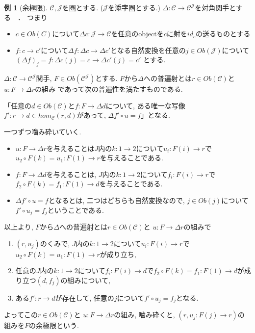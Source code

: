 \documentclass[dvipdfmx,a4paper,11pt]{article}
\theoremstyle{definition}
\newtheorem{exa}[thm]{例}
\begin{document}
\begin{exa}[余極限]
$\mathcal{C}, \mathcal{J}$を圏とする. ($\mathcal{J}$を添字圏とする.)
$\Delta : \mathcal{C} \to \mathcal{C}^{\mathcal{J}}$を対角関手とする　．
つまり
\begin{itemize}
\item$c \in Ob(C)$について$\Delta c : \mathcal{J} \to \mathcal{C}$を任意のobjectを$c$に射を$id_c$の送るものとする
\item  $f: c \to c'$について$\Delta f : \Delta c \to \Delta c'$となる自然変換を任意の$j \in Ob(\mathcal{J})$について$(\Delta f)_{j}=f : \Delta c(j) = c \to \Delta c' (j)=c' $ とする.
\end{itemize}

$\Delta : \mathcal{C} \to \mathcal{C}^{\mathcal{J}}$関手, 
$F \in Ob(\mathcal{C}^{\mathcal{J}})$とする.
$F$から$\Delta $への普遍射とは$r \in Ob(\mathcal{C})$と $u: F \to \Delta r$の組み
であって次の普遍性を満たすものである.

「任意の$d \in Ob(\mathcal{C})$と$f : F\to \Delta d$について, ある唯一な写像$f' : r \to d \in hom_{\mathcal{C}}(r,d)$があって, $\Delta f' \circ u =f$」となる.

一つずつ噛み砕いていく.
\begin{itemize}
\item $u: F \to \Delta r$を与えることは$J$内の$k : 1\to 2$について$u_i : F(i) \to r$で$u_2 \circ F(k) = u_1 : F(1) \to r$を与えることである.
\item $f : F\to \Delta d$を与えることは, $J$内の$k : 1\to 2$について$f_i : F(i) \to r$で$f_2 \circ F(k) = f_1 : F(1) \to d$を与えることである.
\item  $\Delta f' \circ u =f$となるとは, 二つはどちらも自然変換なので, $j \in Ob(j)$について$f' \circ u_j = f_j$ということである.
\end{itemize}
以上より, $F$から$\Delta $への普遍射とは$r \in Ob(\mathcal{C})$と $u: F \to \Delta r$の組みで
\begin{enumerate}
\item $(r, u_j)$のくみで, $J$内の$k : 1\to 2$について$u_i : F(i) \to r$で$u_2 \circ F(k) = u_1 : F(1) \to r$が成り立ち, 
\item 任意の$J$内の$k : 1\to 2$について$f_i : F(i) \to d$で$f_2 \circ F(k) = f_1 : F(1) \to d$が成り立つ$(d, f_j)$の組みについて,
\item ある$f' : r \to d$が存在して, 任意の$j$について$f' \circ u_j = f_j$となる.
\end{enumerate}
よってこの$r \in Ob(\mathcal{C})$と $u: F \to \Delta r$の組み, 噛み砕くと,
$(r, u_j : F(j) \to r)$の組みを$F$の余極限という. 
\end{exa}
\end{document}
